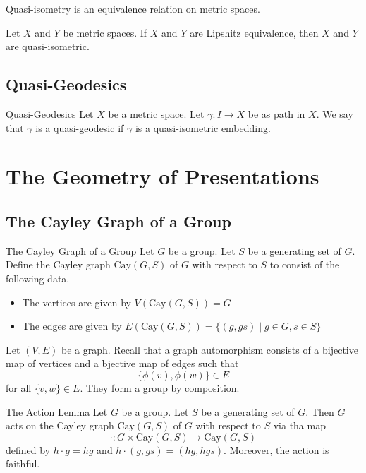 \documentclass[a4paper]{article}
\begin{document}
\begin{prp}{}{} Quasi-isometry is an equivalence relation on metric spaces. 
\end{prp}

\begin{prp}{}{} Let $X$ and $Y$ be metric spaces. If $X$ and $Y$ are Lipshitz equivalence, then $X$ and $Y$ are quasi-isometric. 
\end{prp}

\subsection{Quasi-Geodesics}
\begin{defn}{Quasi-Geodesics}{} Let $X$ be a metric space. Let $\gamma:I\to X$ be as path in $X$. We say that $\gamma$ is a quasi-geodesic if $\gamma$ is a quasi-isometric embedding. 
\end{defn}

\pagebreak
\section{The Geometry of Presentations}
\subsection{The Cayley Graph of a Group}
\begin{defn}{The Cayley Graph of a Group}{} Let $G$ be a group. Let $S$ be a generating set of $G$. Define the Cayley graph $\text{Cay}(G,S)$ of $G$ with respect to $S$ to consist of the following data. 
\begin{itemize}
\item The vertices are given by $V(\text{Cay}(G,S))=G$
\item The edges are given by $E(\text{Cay}(G,S))=\{(g,gs)\;|\;g\in G,s\in S\}$
\end{itemize}
\end{defn}

Let $(V,E)$ be a graph. Recall that a graph automorphism consists of a bijective map of vertices and a bjective map of edges such that $$\{\phi(v),\phi(w)\}\in E$$ for all $\{v,w\}\in E$. They form a group by composition. 

\begin{lmm}{The Action Lemma}{} Let $G$ be a group. Let $S$ be a generating set of $G$. Then $G$ acts on the Cayley graph $\text{Cay}(G,S)$ of $G$ with respect to $S$ via tha map $$\cdot:G\times\text{Cay}(G,S)\to\text{Cay}(G,S)$$ defined by $h\cdot g=hg$ and $h\cdot (g,gs)=(hg,hgs)$. Moreover, the action is faithful. 
\end{lmm}
\end{document}
